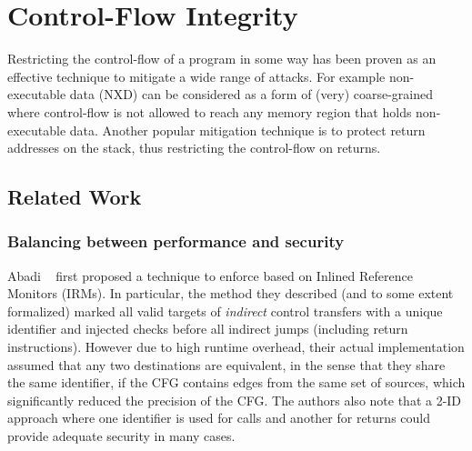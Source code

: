 \chapter{Control-Flow Integrity}\label{ch:cfi}


Restricting the control-flow of a program in some way has been proven
as an effective technique to mitigate a wide range of attacks.  For
example non-executable data (NXD) can be considered as a form of
(very) coarse-grained \CFI where control-flow is not allowed to reach
any memory region that holds non-executable data. Another popular
mitigation technique is to protect return addresses on the stack, thus
restricting the control-flow on returns.



\section{Related Work}

\subsection{Balancing between performance and security}\label{sec:security_cfi}

Abadi \ETAL~\cite{abadi2005} first proposed a technique to enforce
\CFI based on Inlined Reference Monitors (IRMs). In particular, the
method they described (and to some extent formalized) marked all valid
targets of \emph{indirect} control transfers with a unique identifier
and injected checks before all indirect jumps (including return
instructions). However due to high runtime overhead, their actual
implementation assumed that any two destinations are equivalent, in
the sense that they share the same identifier, if the CFG contains
edges from the same set of sources, which significantly reduced the
precision of the CFG. The authors also note that a 2-ID approach where
one identifier is used for calls and another for returns could provide
adequate security in many cases.

